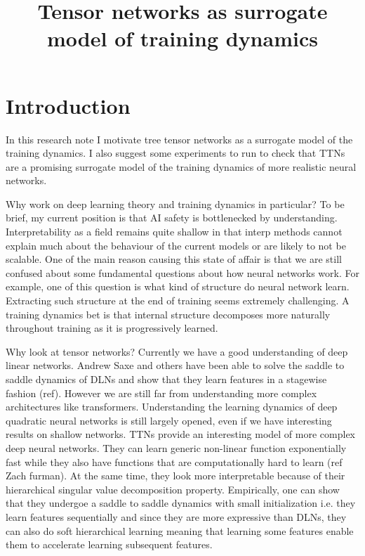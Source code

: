 \documentclass{article}
\title{Tensor networks as surrogate model of training dynamics}
\theoremstyle{definition}
\begin{document}
\maketitle
\section{Introduction}
In this research note I motivate tree tensor networks as a surrogate model of the training dynamics. I also suggest some experiments to run to check that TTNs are a promising surrogate model of the training dynamics of more realistic neural networks. 

Why work on deep learning theory and training dynamics in particular? To be brief, my current position is that AI safety is bottlenecked by understanding. Interpretability as a field remains quite shallow in that interp methods cannot explain much about the behaviour of the current models or are likely to not be scalable. One of the main reason causing this state of affair is that we are still confused about some fundamental questions about how neural networks work. For example, one of this question is what kind of structure do neural network learn. Extracting such structure at the end of training seems extremely challenging. A training dynamics bet is that internal structure decomposes more naturally throughout training as it is progressively learned.


Why look at tensor networks? Currently we have a good understanding of deep linear networks. Andrew Saxe and others have been able to solve the saddle to saddle dynamics of DLNs and show that they learn features in a stagewise fashion (ref). However we are still far from understanding more complex architectures like transformers. Understanding the learning dynamics of deep quadratic neural networks is still largely opened, even if we have interesting results on shallow networks. TTNs provide an interesting model of more complex deep neural networks. They can learn generic non-linear function exponentially fast while they also have functions that are computationally hard to learn (ref Zach furman). At the same time, they look more interpretable because of their hierarchical singular value decomposition property. Empirically, one can show that they undergoe a saddle to saddle dynamics with small initialization i.e. they learn features sequentially and since they are more expressive than DLNs, they can also do soft hierarchical learning meaning that learning some features enable them to accelerate learning subsequent features.
\end{document}
